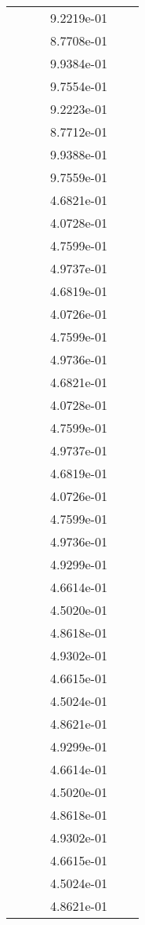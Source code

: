 \begin{xltabular}{\textwidth}{r|rS[table-format=1.3e+2]S[table-format=1.4e+2]S[table-format=1.4e+2]S[table-format=-1.5]}
&  &  & 9.2219e-01 & & \\
&  &  & 8.7708e-01 & & \\
&  &  & 9.9384e-01 & & \\
&  &  & 9.7554e-01 & & \\
&  &  & 9.2223e-01 & & \\
&  &  & 8.7712e-01 & & \\
&  &  & 9.9388e-01 & & \\
&  &  & 9.7559e-01 & & \\
&  &  & 4.6821e-01 & & \\
&  &  & 4.0728e-01 & & \\
&  &  & 4.7599e-01 & & \\
&  &  & 4.9737e-01 & & \\
&  &  & 4.6819e-01 & & \\
&  &  & 4.0726e-01 & & \\
&  &  & 4.7599e-01 & & \\
&  &  & 4.9736e-01 & & \\
&  &  & 4.6821e-01 & & \\
&  &  & 4.0728e-01 & & \\
&  &  & 4.7599e-01 & & \\
&  &  & 4.9737e-01 & & \\
&  &  & 4.6819e-01 & & \\
&  &  & 4.0726e-01 & & \\
&  &  & 4.7599e-01 & & \\
&  &  & 4.9736e-01 & & \\
&  &  & 4.9299e-01 & & \\
&  &  & 4.6614e-01 & & \\
&  &  & 4.5020e-01 & & \\
&  &  & 4.8618e-01 & & \\
&  &  & 4.9302e-01 & & \\
&  &  & 4.6615e-01 & & \\
&  &  & 4.5024e-01 & & \\
&  &  & 4.8621e-01 & & \\
&  &  & 4.9299e-01 & & \\
&  &  & 4.6614e-01 & & \\
&  &  & 4.5020e-01 & & \\
&  &  & 4.8618e-01 & & \\
&  &  & 4.9302e-01 & & \\
&  &  & 4.6615e-01 & & \\
&  &  & 4.5024e-01 & & \\
&  &  & 4.8621e-01 & & \\

\end{xltabular}

